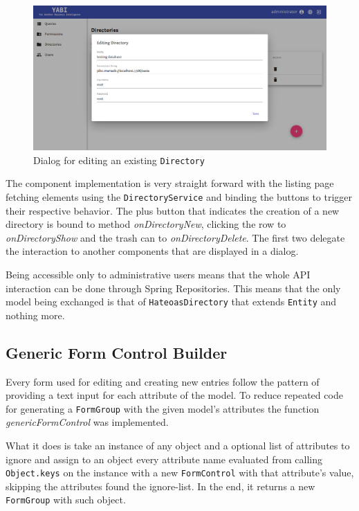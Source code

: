 \begin{figure}
  \centering
  \includegraphics[width=.8\textwidth]{images/screenshots/directory/directory-edit}
  \caption{Dialog for editing an existing \texttt{Directory}}\label{fig:diredit}
\end{figure}

The component implementation is very straight forward with the listing page fetching elements using the \texttt{DirectoryService} and binding the buttons to trigger their respective behavior. The plus button that indicates the creation of a new directory is bound to method \textit{onDirectoryNew}, clicking the row to \textit{onDirectoryShow} and the trash can to \textit{onDirectoryDelete}. The first two delegate the interaction to another components that are displayed in a dialog. 

Being accessible only to administrative users means that the whole \gls{API} interaction can be done through Spring Repositories. This means that the only model being exchanged is that of \texttt{HateoasDirectory} that extends \texttt{Entity} and nothing more.

\subsection{Generic Form Control Builder}\label{gfcb}
Every form used for editing and creating new entries follow the pattern of providing a text input for each attribute of the model. To reduce repeated code for generating a \texttt{FormGroup} with the given model's attributes the function \textit{genericFormControl} was implemented.

What it does is take an instance of any object and a optional list of attributes to ignore and assign to an object every attribute name evaluated from calling \texttt{Object.keys} on the instance with a new \texttt{FormControl} with that attribute's value, skipping the attributes found the ignore-list. In the end, it returns a new \texttt{FormGroup} with such object.

